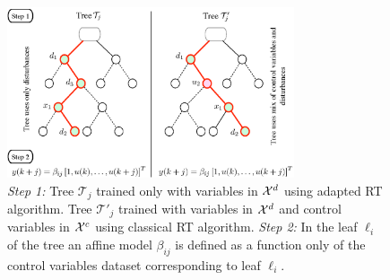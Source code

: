 \begin{figure}[t!]
	\centering
	\includegraphics[width=20pc]{figures/dpc-sepvars.eps}
	\caption{\textit{Step 1:} Tree $\mathcal{T}_j$ trained only with variables in $\mathcal{X}^d$ using adapted RT algorithm. Tree $\mathcal{T}'_j$ trained with variables in $\mathcal{X}^d$ and control variables in $\mathcal{X}^c$ using classical RT algorithm. \textit{Step 2:} In the leaf $\ell_i$ of the tree an affine model $\beta_{ij}$ is defined as a function only of the control variables dataset corresponding to leaf $\ell_i$.}
	\captionsetup{justification=centering}
	\label{F:dpc-sepvars}
\end{figure}

